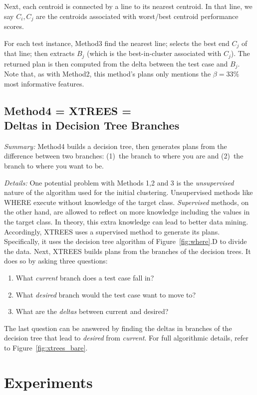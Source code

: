 \documentclass{sig-alternate}
\newcommand{\be}{\begin{enumerate}}
\newcommand{\ee}{\end{enumerate}}
\newcommand{\fig}[1]{Figure~\ref{fig:#1}}
\begin{document}
Next,  each centroid is connected by a line to its nearest centroid.
 In that line, we say $C_i,C_j$ are the centroids associated with worst/best centroid performance scores.  

For each test instance, Method3 
find the nearest line; selects the  best end $C_j$ of that line;  then extracts $B_j$ (which is the
 best-in-cluster associated with  $C_j$).
The returned plan is then computed   from the delta between the test case
and $B_j$.
Note that, as with Method2, this method's plans only mentions the  $\beta=33\%$ most informative features. 
%




\subsection{Method4 =  XTREES =\\ Deltas in Decision Tree Branches}

{\em Summary:} Method4 builds a decision tree,  then generates
plans from the difference between two branches:
(1)~the branch to where you are and (2)~the branch to where you want to be.


{\em Details:} One potential problem with Methods 1,2 and 3 is the {\em unsupervised} nature of
the algorithm used for the initial clustering. Unsupervised methods like WHERE
execute without knowledge of the target class.
{\em Supervised} methods, on the other hand, are allowed to reflect on more knowledge including
the values in the target class. In theory, this extra knowledge can lead to better data mining.
Accordingly, XTREES uses a supervised method to generate its plans.
Specifically, it  uses the decision tree algorithm of \fig{where}.D to divide the data.
Next, XTREES builds plans from the branches of the decision trees. It does so by asking three questions:
\be
\item
What {\em current} branch does a test case fall in?
\item What {\em desired} branch would the test case want to move to?
\item What are the {\em deltas} between current and desired? 
\ee
The last question can be answered by finding the deltas in branches of the decision tree that lead to {\em desired} from {\em current}. For full algorithmic details, refer to \fig{xtrees_bare}.





\section{Experiments}
\end{document}
